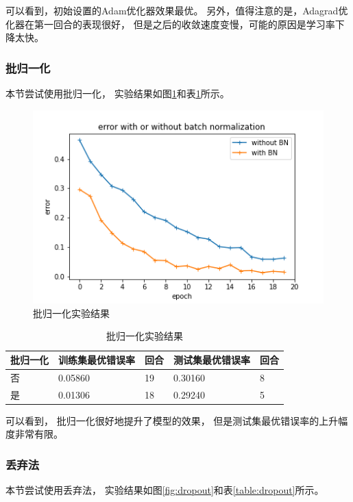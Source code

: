 \documentclass{article}
\begin{document}
可以看到，初始设置的Adam优化器效果最优。
另外，值得注意的是，Adagrad优化器在第一回合的表现很好，
但是之后的收敛速度变慢，可能的原因是学习率下降太快。

\subsubsection{批归一化}

本节尝试使用批归一化，
实验结果如图\ref{fig:BN}和表\ref{table:BN}所示。

\begin{figure}[p]
\includegraphics[width=\textwidth]
{Result/NN BN 0.001/figure.png}
\caption{批归一化实验结果}
\label{fig:BN}
\end{figure}

\begin{table}[h]
\centering
\begin{tabular}{|l|l|l|l|l|} 
\hline
批归一化 & 训练集最优错误率 & 回合 & 测试集最优错误率 & 回合 \\
\hline
否 & 0.05860 & 19 & 0.30160 & 8 \\
是 & 0.01306 & 18 & 0.29240 & 5 \\
\hline
\end{tabular}
\caption{批归一化实验结果}
\label{table:BN}
\end{table}

可以看到，
批归一化很好地提升了模型的效果，
但是测试集最优错误率的上升幅度非常有限。

\subsubsection{丢弃法}

本节尝试使用丢弃法，
实验结果如图\ref{fig:dropout}和表\ref{table:dropout}所示。
\end{document}
